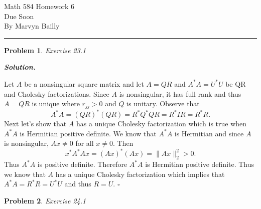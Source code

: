 \documentclass[12pt]{report}
\newtheorem{problem}{Problem}
\newenvironment{solution}[1][\it{Solution}]{\textbf{#1. } }{$\square$}
\begin{document}
\large

\begin{center}
 Math 584 Homework 6\\
 Due Soon\\
 By Marvyn Bailly\\
\end{center}

\normalsize

\hrule



\begin{problem}
    Exercise 23.1
\end{problem}

\begin{solution}

    \noindent
    Let $A$ be a nonsingular square matrix and let $A = QR$ and $A^*A = U^*U$ be QR and Cholesky factorizations. Since $A$ is nonsingular, it has full rank and thus $A = QR$ is unique where $r_{jj} > 0$ and $Q$ is unitary. Observe that
    \[A^*A =(QR)^*(QR) = R^*Q^*QR = R^*IR = R^*R.\]
    Next let's show that $A$ has a unique Cholesky factorization which is true when $A^*A$ is Hermitian positive definite. We know that $A^*A$ is Hermitian and since $A$ is nonsingular, $Ax \neq 0$ for all $x\neq 0$. Then
    \[x^*A^*Ax = (Ax)^*(Ax) = \| Ax \|_2^2>0.\]
    Thus $A^*A$ is positive definite. Therefore $A^*A$ is Hermitian positive definite. Thus we know that $A$ has a unique Cholesky factorization which implies that $A^*A = R^*R = U^*U$ and thus $R = U$.   
\end{solution}

\newpage



\begin{problem}
    Exercise 24.1
\end{problem}
\end{document}
